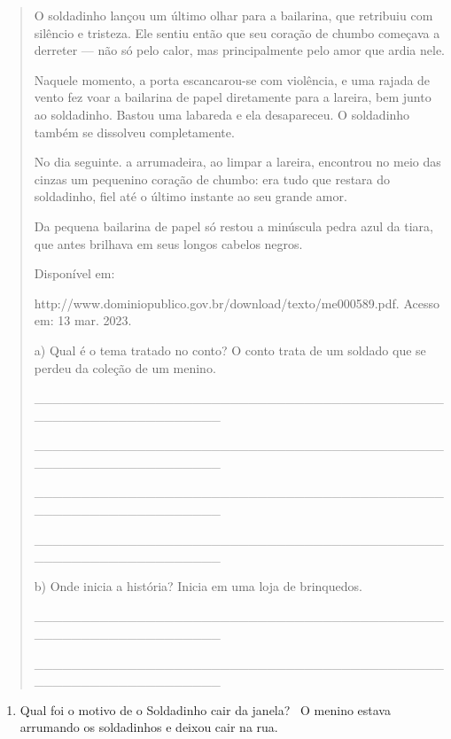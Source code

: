 \begin{itemize}
{{{\begin{itemize}
\begin{itemize}
\begin{itemize}
\begin{quote}
O soldadinho lançou um último olhar para a bailarina, que retribuiu com
silêncio e tristeza. Ele sentiu então que seu coração de chumbo começava
a derreter --- não só pelo calor, mas principalmente pelo amor que ardia
nele.

Naquele momento, a porta escancarou-se com violência, e uma rajada de
vento fez voar a bailarina de papel diretamente para a lareira, bem
junto ao soldadinho. Bastou uma labareda e ela desapareceu. O soldadinho
também se dissolveu completamente.

No dia seguinte. a arrumadeira, ao limpar a lareira, encontrou no meio
das cinzas um pequenino coração de chumbo: era tudo que restara do
soldadinho, fiel até o último instante ao seu grande amor.

Da pequena bailarina de papel só restou a minúscula pedra azul da tiara,
que antes brilhava em seus longos cabelos negros.

Disponível em:

http://www.dominiopublico.gov.br/download/texto/me000589.pdf. Acesso em:
13 mar. 2023.

a) Qual é o tema tratado no conto?
\protect\hypertarget{_Hlk127887290}{}{}O conto trata de um soldado que
se perdeu da coleção de um menino.

\_\_\_\_\_\_\_\_\_\_\_\_\_\_\_\_\_\_\_\_\_\_\_\_\_\_\_\_\_\_\_\_\_\_\_\_\_\_\_\_\_\_\_\_\_\_\_\_\_\_\_\_\_\_\_\_\_\_\_\_\_\_\_\_

\_\_\_\_\_\_\_\_\_\_\_\_\_\_\_\_\_\_\_\_\_\_\_\_\_\_\_\_\_\_\_\_\_\_\_\_\_\_\_\_\_\_\_\_\_\_\_\_\_\_\_\_\_\_\_\_\_\_\_\_\_\_\_\_

\_\_\_\_\_\_\_\_\_\_\_\_\_\_\_\_\_\_\_\_\_\_\_\_\_\_\_\_\_\_\_\_\_\_\_\_\_\_\_\_\_\_\_\_\_\_\_\_\_\_\_\_\_\_\_\_\_\_\_\_\_\_\_\_

\_\_\_\_\_\_\_\_\_\_\_\_\_\_\_\_\_\_\_\_\_\_\_\_\_\_\_\_\_\_\_\_\_\_\_\_\_\_\_\_\_\_\_\_\_\_\_\_\_\_\_\_\_\_\_\_\_\_\_\_\_\_\_\_

b) Onde inicia a história? Inicia em uma loja de brinquedos.

\_\_\_\_\_\_\_\_\_\_\_\_\_\_\_\_\_\_\_\_\_\_\_\_\_\_\_\_\_\_\_\_\_\_\_\_\_\_\_\_\_\_\_\_\_\_\_\_\_\_\_\_\_\_\_\_\_\_\_\_\_\_\_\_

\_\_\_\_\_\_\_\_\_\_\_\_\_\_\_\_\_\_\_\_\_\_\_\_\_\_\_\_\_\_\_\_\_\_\_\_\_\_\_\_\_\_\_\_\_\_\_\_\_\_\_\_\_\_\_\_\_\_\_\_\_\_\_\_
\end{quote}

\begin{enumerate}
\def\labelenumi{\alph{enumi})}
\item
  Qual foi o motivo de o Soldadinho cair da janela? ~O menino estava
  arrumando os soldadinhos e deixou cair na rua.
\end{enumerate}


\end{itemize}
\end{itemize}
\end{itemize}}}}
\end{itemize}
